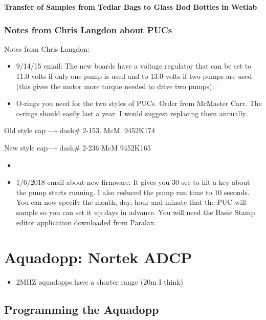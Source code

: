 \documentclass[]{book}
\providecommand{\tightlist}{%
  \setlength{\itemsep}{0pt}\setlength{\parskip}{0pt}}
\begin{document}
\textbf{Transfer of Samples from Tedlar Bags to Glass Bod Bottles in
Wetlab}

\subsection{Notes from Chris Langdon about
PUCs}\label{notes-from-chris-langdon-about-pucs}

Notes from Chris Langdon:

\begin{itemize}
\tightlist
\item
  9/14/15 email: The new boards have a voltage regulator that can be set
  to 11.0 volts if only one pump is used and to 13.0 volts if two pumps
  are used (this gives the motor more torque needed to drive two pumps).
\item
  O-rings you need for the two styles of PUCs. Order from McMaster Carr.
  The o-rings should easily last a year. I would suggest replacing them
  annually.
\end{itemize}

Old style cap ---- dash\# 2-153. McM. 9452K174

New style cap---- dash\# 2-236 McM 9452K165

\begin{itemize}
\item
\item
  1/6/2018 email about new firmware: It gives you 30 sec to hit a key
  about the pump starts running. I also reduced the pump run time to 10
  seconds. You can now specify the month, day, hour and minute that the
  PUC will sample so you can set it up days in advance. You will need
  the Basic Stamp editor application downloaded from Paralax.
\end{itemize}

\chapter{Aquadopp: Nortek ADCP}\label{aquadopp-nortek-adcp}

\begin{itemize}
\tightlist
\item
  2MHZ aquadopps have a shorter range (20m I think)
\end{itemize}

\section{Programming the Aquadopp}\label{programming-the-aquadopp}
\end{document}

